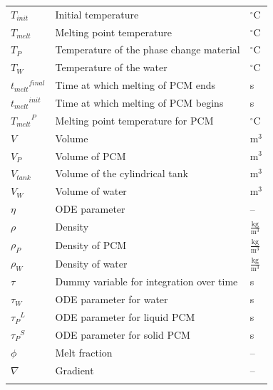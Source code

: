 \documentclass[12pt]{article}
\begin{document}
\begin{longtabu}{l X[l] l}
${T_{init}}$ & Initial temperature & ${}^{\circ}$C
\\
${T_{melt}}$ & Melting point temperature & ${}^{\circ}$C
\\
${T_{P}}$ & Temperature of the phase change material & ${}^{\circ}$C
\\
${T_{W}}$ & Temperature of the water & ${}^{\circ}$C
\\
${{t_{melt}}^{final}}$ & Time at which melting of PCM ends & s
\\
${{t_{melt}}^{init}}$ & Time at which melting of PCM begins & s
\\
${{T_{melt}}^{P}}$ & Melting point temperature for PCM & ${}^{\circ}$C
\\
$V$ & Volume & $\text{m}^{3}$
\\
${V_{P}}$ & Volume of PCM & $\text{m}^{3}$
\\
${V_{tank}}$ & Volume of the cylindrical tank & $\text{m}^{3}$
\\
${V_{W}}$ & Volume of water & $\text{m}^{3}$
\\
$η$ & ODE parameter & --
\\
$ρ$ & Density & $\frac{\text{kg}}{\text{m}^{3}}$
\\
${ρ_{P}}$ & Density of PCM & $\frac{\text{kg}}{\text{m}^{3}}$
\\
${ρ_{W}}$ & Density of water & $\frac{\text{kg}}{\text{m}^{3}}$
\\
$τ$ & Dummy variable for integration over time & s
\\
${τ_{W}}$ & ODE parameter for water & s
\\
${{τ_{P}}^{L}}$ & ODE parameter for liquid PCM & s
\\
${{τ_{P}}^{S}}$ & ODE parameter for solid PCM & s
\\
$ϕ$ & Melt fraction & --
\\
$∇$ & Gradient & --
\\
\bottomrule
\label{Table:ToS}
\end{longtabu}
\end{document}
